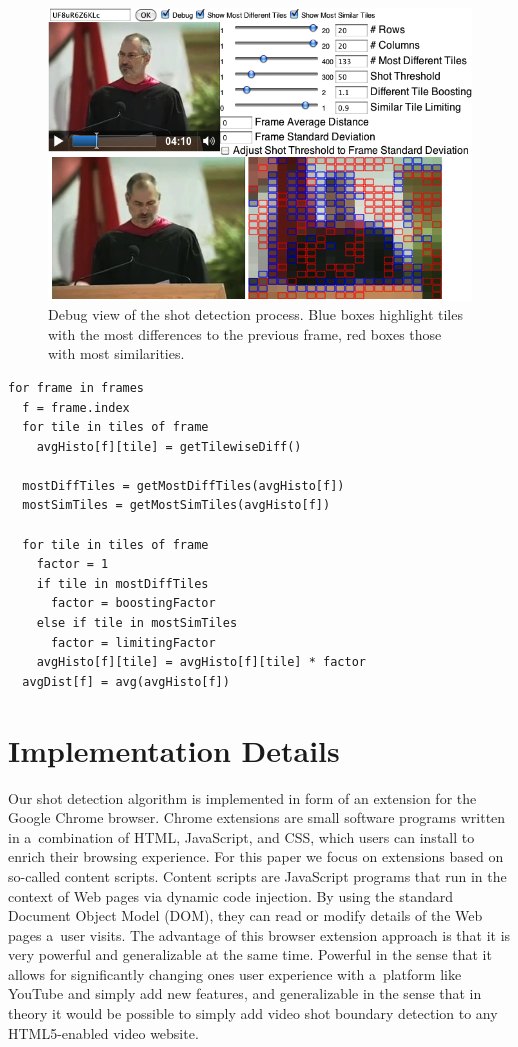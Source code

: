\documentclass{sig-alternate}
\begin{document}
\begin{figure}
\begin{center}
   \includegraphics[width=1.0\linewidth]{./resources/algorithm.png}
\end{center}
   \caption{Debug view of the shot detection process. Blue boxes highlight tiles with the most differences to the previous frame, red boxes those with most similarities.}
\label{fig:algorithm}
\end{figure}

\begin{lstlisting}[caption=Pseudocode of shot detection algorithm., label=code:algorithm, float]
for frame in frames
  f = frame.index  
  for tile in tiles of frame      
    avgHisto[f][tile] = getTilewiseDiff()
 
  mostDiffTiles = getMostDiffTiles(avgHisto[f])
  mostSimTiles = getMostSimTiles(avgHisto[f])
 
  for tile in tiles of frame    
    factor = 1  
    if tile in mostDiffTiles
      factor = boostingFactor
    else if tile in mostSimTiles
      factor = limitingFactor
    avgHisto[f][tile] = avgHisto[f][tile] * factor
  avgDist[f] = avg(avgHisto[f])
\end{lstlisting}

\section{Implementation Details} \label{sec:implementation}
Our shot detection algorithm is implemented in form of an extension for the Google Chrome browser. Chrome extensions are small software programs written in a~combination of HTML, JavaScript, and CSS, which users can install to enrich their browsing experience. For this paper we focus on extensions based on so-called content scripts. Content scripts are JavaScript programs that run in the context of Web pages via dynamic code injection. By using the standard Document Object Model (DOM), they can read or modify details of the Web pages a~user visits. The advantage of this browser extension approach is that it is very powerful and generalizable at the same time. Powerful in the sense that it allows for significantly changing ones user experience with a~platform like YouTube and simply add new features, and generalizable in the sense that in theory it would be possible to simply add video shot boundary detection to any HTML5-enabled video website.
\end{document}
